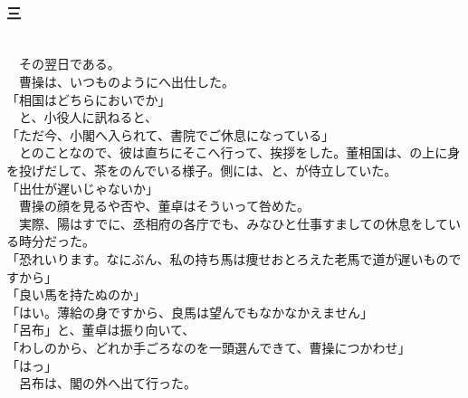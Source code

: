 \documentclass[
  paper=a5,
  fontsize=10pt,
  jafontsize=9.5pt,
  tate,                  %
  open_bracket_pos=nibu, %
]{jlreq}
\begin{document}
\\

\subsubsection{三}

\\


　その翌日である。\\


　曹操は、いつものようにへ出仕した。\\


「相国はどちらにおいでか」\\


　と、小役人に訊ねると、\\


「ただ今、小閣へ入られて、書院でご休息になっている」\\


　とのことなので、彼は直ちにそこへ行って、挨拶をした。董相国は、の上に身を投げだして、茶をのんでいる様子。側には、と、が侍立していた。\\


「出仕が遅いじゃないか」\\


　曹操の顔を見るや否や、董卓はそういって咎めた。\\


　実際、陽はすでに、丞相府の各庁でも、みなひと仕事すましての休息をしている時分だった。\\


「恐れいります。なにぶん、私の持ち馬は痩せおとろえた老馬で道が遅いものですから」\\


「良い馬を持たぬのか」\\


「はい。薄給の身ですから、良馬は望んでもなかなかえません」\\


「呂布」と、董卓は振り向いて、\\


「わしのから、どれか手ごろなのを一頭選んできて、曹操につかわせ」\\


「はっ」\\


　呂布は、閣の外へ出て行った。\\
\end{document}
